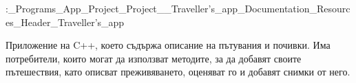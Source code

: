 \label{index_md_D}%
%
\+:\+\_\+\+Programs\+\_\+\+App\+\_\+\+Project\+\_\+\+Project\+\_\+\_\+\+Traveller’s\+\_\+app\+\_\+\+Documentation\+\_\+\+Resources\+\_\+\+Header\+\_\+\+Traveller’s\+\_\+app

Приложение на C++, което съдържа описание на пътувания и почивки. Има потребители, които могат да използват методите, за да добавят своите пътешествия, като описват преживяването, оценяват го и добавят снимки от него. 